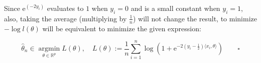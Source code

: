 \documentclass{article}
\begin{document}
\begin{comment}
Thus, we should compute the gradient of the negative $\log$-likelihood w.r.t. $\theta$, set to $0$ and solve for $\theta$
\footnote{Deisenroth, Marc Peter, Faisal, A. Aldo, Ong, Cheng Soon, \textit{Mathematics for Machine Learning}, Cambridge University Press, 2020, pp. 351.}
:

\begin{equation*}
    \begin{split}
        \nabla \left( - \log l(\theta) \right) 
        &= \nabla \left( - \sum_{i=1}^n \left[ - \langle x_i, \theta \rangle(1 - 2y_i) - \log \left( 1 + \mathrm{e}^{-\langle x_i, \theta \rangle} \right) \right] \right) \\
        &= \nabla \left( \sum_{i=1}^n \langle x_i, \theta \rangle(1 - 2y_i)\right) + \nabla \left(\sum_{i=1}^n\log \left( 1 + \mathrm{e}^{-\langle x_i, \theta \rangle} \right)\right) \\
        &= \sum_{i=1}^n \left[ x_i(1 - 2y_i) - x_i \frac{\mathrm{e}^{-\langle x_i, \theta \rangle}}{1 + \mathrm{e}^{-\langle x_i, \theta \rangle}} \right] \\
        &= \sum_{i=1}^n \left[ \frac{x_i(1 - 2y_i)(1 + \mathrm{e}^{-\langle x_i, \theta \rangle})}{(1 + \mathrm{e}^{-\langle x_i, \theta \rangle})} - \frac{x_i \mathrm{e}^{-\langle x_i, \theta \rangle}}{1 + \mathrm{e}^{-\langle x_i, \theta \rangle}} \right] \\
    \end{split}
\end{equation*}
\end{comment}


Since $\mathrm{e}^{(- 2y_i)}$ evaluates to $1$ when $y_i = 0$ and is a small constant when $y_i = 1$,
also, taking the average (multiplying by $\frac{1}{n}$) will not change the result,
to minimize $- \log l(\theta)$ will be equivalent to minimize the given expression:

\begin{equation*}
\hat{\theta}_n \in \underset{\theta \in \mathbb{R}^p}{\operatorname{argmin}} L ( \theta ), \quad L (\theta) := \frac{1}{n} \sum_{i = 1}^n \log \left( 1 + \mathrm{e}^{-2(y_i - \frac{1}{2})\langle x_i, \theta \rangle} \right) \qquad \square
\end{equation*} 
\end{document}
